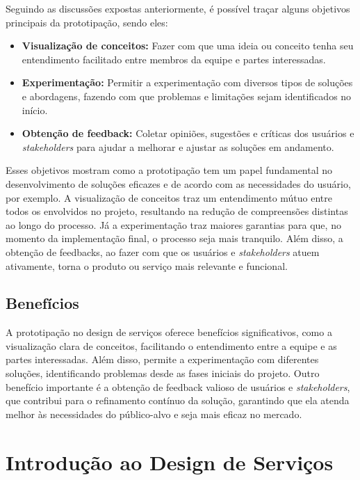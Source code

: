 Seguindo as discussões expostas anteriormente, é possível traçar alguns objetivos principais da prototipação, sendo eles:

\begin{itemize}
	\item \textbf{Visualização de conceitos:} Fazer com que uma ideia ou conceito tenha seu entendimento facilitado entre membros da equipe e partes interessadas.
	
	\item \textbf{Experimentação:} Permitir a experimentação com diversos tipos de soluções e abordagens, fazendo com que problemas e limitações sejam identificados no início.
	
	\item \textbf{Obtenção de feedback:} Coletar opiniões, sugestões e críticas dos usuários e \textit{stakeholders} para ajudar a melhorar e ajustar as soluções em andamento.
\end{itemize}

Esses objetivos mostram como a prototipação tem um papel fundamental no desenvolvimento de soluções eficazes e de acordo com as necessidades do usuário, por exemplo. A visualização de conceitos traz um entendimento mútuo entre todos os envolvidos no projeto, resultando na redução de compreensões distintas ao longo do processo. Já a experimentação traz maiores garantias para que, no momento da implementação final, o processo seja mais tranquilo. Além disso, a obtenção de feedbacks, ao fazer com que os usuários e \textit{stakeholders} atuem ativamente, torna o produto ou serviço mais relevante e funcional.

\subsection{Benefícios}

A prototipação no design de serviços oferece benefícios significativos, como a visualização clara de conceitos, facilitando o entendimento entre a equipe e as partes interessadas. Além disso, permite a experimentação com diferentes soluções, identificando problemas desde as fases iniciais do projeto. Outro benefício importante é a obtenção de feedback valioso de usuários e \textit{stakeholders}, que contribui para o refinamento contínuo da solução, garantindo que ela atenda melhor às necessidades do público-alvo e seja mais eficaz no mercado.



\section{Introdução ao Design de Serviços}

